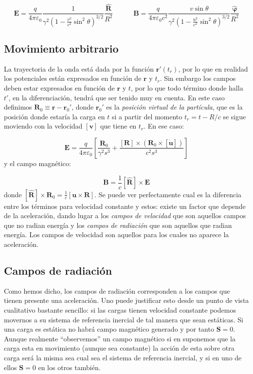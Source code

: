 \documentclass[12pt,a4paper]{article}
\newcommand{\parentesis}[1]{\left( #1  \right)}
\newcommand{\ccorchetes}[1]{\left[ #1  \right]}
\newcommand{\tquad}{\quad \quad \quad}
\newcommand{\Bn}{\mathbf{B}}
\newcommand{\En}{\mathbf{E}}
\newcommand{\vn}{\mathbf{v}}
\newcommand{\rn}{\mathbf{r}}
\newcommand{\Sn}{\mathbf{S}}
\newcommand{\un}{\mathbf{u}}
\newcommand{\Rn}{\mathbf{R}}
\newcommand{\hnR}{\hat{\mathbf{R}}}
\newcommand{\hnvarphi}{\hat{\boldsymbol{\varphi}}}
\numberwithin{equation}{section}
\numberwithin{figure}{section}
\begin{document}
\begin{equation}
\En = \dfrac{q}{4 \pi \varepsilon_0} \dfrac{1}{\gamma^2 \parentesis{1-\frac{v^2}{c^2} \sin^2 \theta}^{3/2}} \dfrac{\hnR}{R^2} \tquad \Bn = \dfrac{q}{4 \pi \varepsilon_0 c^2} \dfrac{v \sin \theta}{\gamma^2 \parentesis{1-\frac{u^2}{c^2} \sin^2 \theta}^{3/2}} \dfrac{\hnvarphi}{R^2}
\end{equation}

\subsection{Movimiento arbitrario}

La trayectoria de la onda está dada por la función $\rn'(t_r)$, por lo que en realidad los potenciales están expresados en función de $\rn$ y $t_r$. Sin embargo los campos deben estar expresados en función de $\rn$ y $t$, por lo que todo término donde halla $t'$, en la diferenciación, tendrá que ser tenido muy en cuenta. En este caso definimos $\Rn_0 \equiv \rn - \rn_0'$, donde $\rn_0'$ es la \textit{posición virtual de la partícula}, que es la posición donde estaría la carga en $t$ si  a partir del momento $t_r = t - R/c$ se sigue moviendo con la velocidad $[\vn]$ que tiene en $t_r$. En ese caso:

\begin{equation}
\En = \dfrac{q}{4 \pi \varepsilon_0} \ccorchetes{\dfrac{\Rn_0}{\gamma^2 s^3} + \dfrac{[\Rn] \times (\Rn_0 \times [\dot{\un}])}{c^2 s^3}}
\end{equation}
y el campo magnético:

\begin{equation}
\Bn = \dfrac{1}{c} [\hnR ] \times \En
\end{equation}
donde $[\hnR] \times \Rn_0 = \frac{1}{c} [\un \times \Rn]$. Se puede  ver perfectamente cual es la diferencia entre los términos para velocidad constante y estos: existe un factor que depende de la aceleración, dando lugar a los \textit{campos de velocidad} que son aquellos campos que no radian energía y los \textit{campos de radiación} que son aquellos que radian energía. Los campos de velocidad son aquellos para los cuales no aparece la aceleración. 

\subsection{Campos de radiación}

Como hemos dicho, los campos de radiación corresponden a los campos que tienen presente una aceleración. Uno puede justificar esto desde un punto de vista cualitativo bastante sencillo: si las cargas tienen velocidad constante podemos movernos a su sistema de referencia inercial de tal manera que sean estáticas. Si una carga es estática no habrá campo magnético generado y por tanto $\Sn = 0$. Aunque realmente ``observemos'' un campo magnético si en suponemos que la carga esta en movimiento (aunque sea constante) la acción de esta sobre otra carga será la misma sea cual sea el sistema de referencia inercial, y si en uno de ellos $\Sn=0$ en los otros también.  \\
\end{document}
